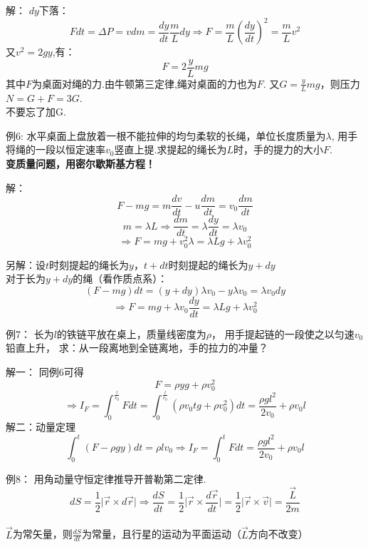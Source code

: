 \documentclass[10pt,a4paper]{article}
\begin{document}
\noindent 解：
$dy$下落：
\[Fdt=\Delta P=vdm=\frac{dy}{dt}\frac{m}{L}dy
\Rightarrow
F=\frac{m}{L}(\frac{dy}{dt})^2=\frac{m}{L}v^2
\]
又$v^2=2gy$,有：
\[F=2\frac{y}{L}mg\]
其中$F$为桌面对绳的力.由牛顿第三定律,绳对桌面的力也为$F$.
又$G=\frac{y}{L}mg$，则压力$N=G+F=3G$.\\
不要忘了加G.

例6:
水平桌面上盘放着一根不能拉伸的均匀柔软的长绳，单位长度质量为$\lambda$,
用手将绳的一段以恒定速率$v_0$竖直上提.求提起的绳长为$L$时，手的提力的大小$F$.
\\\textbf{变质量问题，用密尔歇斯基方程！}

\noindent 解：
\[
F-mg=m\frac{dv}{dt}-u\frac{dm}{dt}=v_0\frac{dm}{dt}\]
\[m=\lambda L\Rightarrow \frac{dm}{dt}=\lambda \frac{dy}{dt}=\lambda v_0\]
\[\Rightarrow F=mg+v_0^2 \lambda=\lambda Lg+\lambda v_0^2\]

\noindent 另解：设$t$时刻提起的绳长为$y$，$t+dt$时刻提起的绳长为$y+dy$\\
对于长为$y+dy$的绳（看作质点系）：
\[(F-mg)dt=(y+dy)\lambda v_0-y\lambda v_0=\lambda v_0dy\]
\[\Rightarrow F=mg+\lambda v_0\frac{dy}{dt}=\lambda Lg+\lambda v_0^2\]

例7：
长为$l$的铁链平放在桌上，质量线密度为$\rho$，
用手提起链的一段使之以匀速$v_0$铅直上升，
求：从一段离地到全链离地，手的拉力的冲量？

\noindent 解一：
同例6可得\[F=\rho yg+\rho v_0^2\]
\[\Rightarrow I_F=\int_0^{\frac{l}{v_0}}Fdt
=\int_0^{\frac{l}{v_0}}(\rho v_0tg+\rho v_0^2)dt
=\frac{\rho gl^2}{2v_0}+\rho v_0l\]
\noindent 解二：动量定理
\[\int_0^t(F-\rho gy)dt=\rho lv_0
\Rightarrow I_F=\int_0^tFdt=\frac{\rho gl^2}{2v_0}+\rho v_0l\]

例8：
用角动量守恒定律推导开普勒第二定律.
\[dS=\frac{1}{2}\lvert \vec{r}\times d\vec{r}\rvert
\Rightarrow \frac{dS}{dt}=\frac{1}{2}\lvert \vec{r}\times \frac{d\vec{r}}{dt}\rvert
=\frac{1}{2}\lvert \vec{r}\times \vec{v}\rvert
=\frac{\vec{L}}{2m}
\]\\
$\vec{L}$为常矢量，则$\frac{dS}{dt}$为常量，且行星的运动为平面运动（$\vec{L}$方向不改变）
\end{document}
